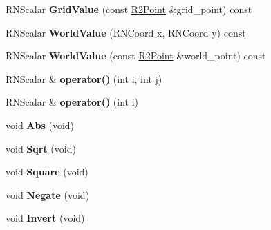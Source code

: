 \begin{DoxyCompactItemize}
\item 
R\+N\+Scalar {\bfseries Grid\+Value} (const \hyperlink{class_r2_point}{R2\+Point} \&grid\+\_\+point) const \hypertarget{class_r2_grid_a6f1ccc66b440d81904b2ebab6f01a02c}{}\label{class_r2_grid_a6f1ccc66b440d81904b2ebab6f01a02c}

\item 
R\+N\+Scalar {\bfseries World\+Value} (R\+N\+Coord x, R\+N\+Coord y) const \hypertarget{class_r2_grid_a340a7b0f3b79dff2cbc136d231680dea}{}\label{class_r2_grid_a340a7b0f3b79dff2cbc136d231680dea}

\item 
R\+N\+Scalar {\bfseries World\+Value} (const \hyperlink{class_r2_point}{R2\+Point} \&world\+\_\+point) const \hypertarget{class_r2_grid_a92ad86cf4389c62a4ef20209982a6d98}{}\label{class_r2_grid_a92ad86cf4389c62a4ef20209982a6d98}

\item 
R\+N\+Scalar \& {\bfseries operator()} (int i, int j)\hypertarget{class_r2_grid_a453059226abc07dcb83da0b24c415e67}{}\label{class_r2_grid_a453059226abc07dcb83da0b24c415e67}

\item 
R\+N\+Scalar \& {\bfseries operator()} (int i)\hypertarget{class_r2_grid_a891a72a9f832c109ef478e36e75aa345}{}\label{class_r2_grid_a891a72a9f832c109ef478e36e75aa345}

\item 
void {\bfseries Abs} (void)\hypertarget{class_r2_grid_acf4d6434c17703178785c1c893b3b58b}{}\label{class_r2_grid_acf4d6434c17703178785c1c893b3b58b}

\item 
void {\bfseries Sqrt} (void)\hypertarget{class_r2_grid_a5dac580b5d6014f1a3f829ab99f9c9a2}{}\label{class_r2_grid_a5dac580b5d6014f1a3f829ab99f9c9a2}

\item 
void {\bfseries Square} (void)\hypertarget{class_r2_grid_af00c2203810898918c15037631953d5a}{}\label{class_r2_grid_af00c2203810898918c15037631953d5a}

\item 
void {\bfseries Negate} (void)\hypertarget{class_r2_grid_aa1c4326dcd902007c128f8efb02e9109}{}\label{class_r2_grid_aa1c4326dcd902007c128f8efb02e9109}

\item 
void {\bfseries Invert} (void)\hypertarget{class_r2_grid_abd465e0802735efc064e049da7ffe25d}{}\label{class_r2_grid_abd465e0802735efc064e049da7ffe25d}


\end{DoxyCompactItemize}
